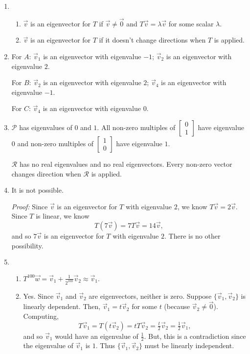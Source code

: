 \documentclass[red]{tutorial}
\newcommand{\mat}[1]{\begin{bmatrix}#1\end{bmatrix}}
\theoremstyle{definition}
\theoremstyle{theorem}
\begin{document}
	\begin{solutions}
		\begin{enumerate}
			\item \begin{enumerate}
					\item $\vec v$ is an eigenvector for $T$ if $\vec v\neq \vec 0$ and
						$T\vec v=\lambda \vec v$ for some scalar $\lambda$.
					\item $\vec v$ is an eigenvector for $T$ if it doesn't change directions
						when $T$ is applied.
			\end{enumerate}
			\item 
				For $A$: 
				$\vec v_1$ is an eigenvector with eigenvalue $-1$;
				$\vec v_2$ is an eigenvector with eigenvalue $2$.

				For $B$: 
				$\vec v_2$ is an eigenvector with eigenvalue $2$;
				$\vec v_4$ is an eigenvector with eigenvalue $-1$.
				
				For $C$: 
				$\vec v_4$ is an eigenvector with eigenvalue $0$.
			\item $\mathcal P$ has eigenvalues of $0$ and $1$. All non-zero multiples of $\mat{0\\1}$
				have eigenvalue $0$ and non-zero multiples of $\mat{1\\0}$ have eigenvalue $1$.

				$\mathcal R$ has no real eigenvalues and no real eigenvectors. Every non-zero 
				vector changes direction when $\mathcal R$ is applied.
			\item It is not possible.

				\emph{Proof:} Since $\vec v$ is an eigenvector for $T$ with eigenvalue
				$2$, we know $T\vec v=2\vec v$. Since $T$ is linear, we know
				\[
					T(7\vec v)=7T\vec v=14\vec v,
				\]
				and so $7\vec v$ is an eigenvector for $T$ with eigenvalue $2$. There is no
				other possibility.
			\item \begin{enumerate}
				\item $T^{100}\vec w=\vec v_1+\tfrac{1}{2^{100}}\vec v_2 \approx \vec v_1$.
				\item Yes. Since $\vec v_1$ and $\vec v_2$ are eigenvectors, neither is zero.
				Suppose $\{\vec v_1,\vec v_2\}$ is linearly dependent. Then, $\vec v_1=t\vec v_2$
					for some $t$ (because $\vec v_2\neq \vec 0$). Computing,
					\[
						T\vec v_1=T(t\vec v_2)=tT\vec v_2=\tfrac{t}{2}\vec v_2 = \tfrac{1}{2}\vec v_1,
					\]
					and so $\vec v_1$ would have an eigenvalue of $\tfrac{1}{2}$. But, this
					is a contradiction since the eigenvalue
					of $\vec v_1$ is $1$. Thus $\{\vec v_1,\vec v_2\}$ must be linearly independent.


\end{enumerate}
\end{enumerate}
\end{solutions}
\end{document}

